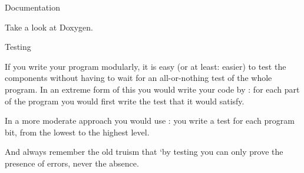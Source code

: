  {Documentation}

Take a look at Doxygen.

 {Testing}

If you write your program modularly, it is easy (or at least: easier)
to test the components without having to wait for an all-or-nothing
test of the whole program. In an extreme form of this you would write
your code by : for each part of the
program you would first write the test that it would satisfy.

In a more moderate approach you would use :
you write a test for each program bit, from the lowest to the highest
level.

And always remember the old truism that `by testing you can only prove
the presence of errors, never the absence.
